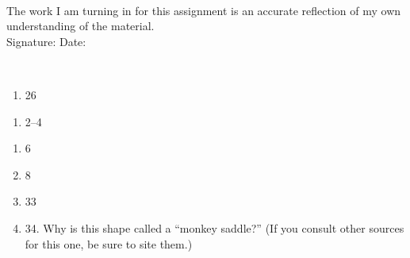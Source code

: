 \documentclass[12pt]{article}
\begin{document}
\\

\bigskip
\bigskip
\bigskip
\bigskip
\bigskip
\bigskip
\noindent The work I am turning in for this assignment is an accurate
reflection of my own understanding of the material.\\[14pt]

\noindent Signature: \underline{\hspace{7cm}} \hspace{1cm} Date:
\underline{\hspace{5cm}} 


\hspace{2mm}\\
\newpage
{}

\begin{enumerate}
\setlength{\itemsep}{-1mm}
  \item 26
\end{enumerate}

\begin{enumerate}
\setlength{\itemsep}{-1mm}
  \item 2--4
\end{enumerate}

\begin{enumerate}
\setlength{\itemsep}{-1mm}
  \item 6
  \item 8
  \item 33
  \item 34.  Why is this shape called a ``monkey saddle?''  (If you
    consult other sources for this one, be sure to site them.)
\end{enumerate}
\end{document}
